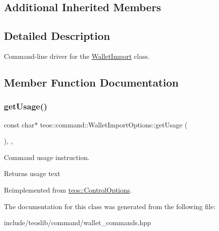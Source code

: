 \subsection*{Additional Inherited Members}


\subsection{Detailed Description}
Command-\/line driver for the \mbox{\hyperlink{classteos_1_1command_1_1_wallet_import}{Wallet\+Import}} class. 

\subsection{Member Function Documentation}
\mbox{\label{classteos_1_1command_1_1_wallet_import_options_ad641b37bd61f2d4ff3e3049e2dd6be0e}} 
\subsubsection{\texorpdfstring{get\+Usage()}{getUsage()}}
{\footnotesize\ttfamily const char$\ast$ teos\+::command\+::\+Wallet\+Import\+Options\+::get\+Usage (\begin{DoxyParamCaption}{ }\end{DoxyParamCaption})\hspace{0.3cm}{\ttfamily [inline]}, {\ttfamily [protected]}, {\ttfamily [virtual]}}



Command \textquotesingle{}usage\textquotesingle{} instruction. 

\begin{DoxyReturn}{Returns}
usage text 
\end{DoxyReturn}


Reimplemented from \mbox{\hyperlink{classteos_1_1_control_options_a0aa5671f9bc750ed5280c26c543874f3}{teos\+::\+Control\+Options}}.



The documentation for this class was generated from the following file\+:\begin{DoxyCompactItemize}
\item 
include/teoslib/command/wallet\+\_\+commands.\+hpp\end{DoxyCompactItemize}
